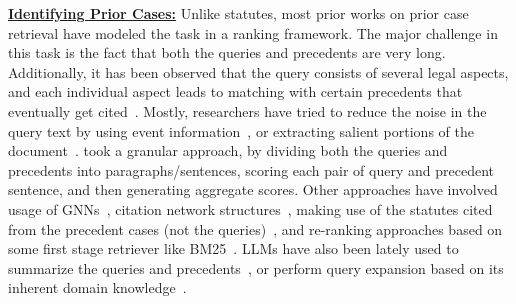 \vspace{1mm}
\noindent\underline{\bf Identifying Prior Cases:} \label{sec:relwork/precedents}
Unlike statutes, most prior works on prior case retrieval have modeled the task in a ranking framework. The major challenge in this task is the fact that both the queries and precedents are very long. 
Additionally, it has been observed that the query consists of several legal aspects, and each individual aspect leads to matching with certain precedents that eventually get cited~\citep{rabelo2022semantic}. 
Mostly, researchers have tried to reduce the noise in the query text by using event information~\citep{joshi2023ucreat,tang2024casegnn}, or extracting salient portions of the document~\citep{qin2024ljpretrieval}. 
\citet{rabelo2022semantic} took a granular approach, by dividing both the queries and precedents into paragraphs/sentences, scoring each pair of query and precedent sentence, and then generating aggregate scores.
Other approaches have involved usage of GNNs~\citep{tang2024casegnn,tang2024caselink}, citation network structures~\citep{bhattacharya2020hierspcnet}, making use of the statutes cited from the precedent cases (not the queries)~\citep{qin2024ljpretrieval}, and re-ranking approaches based on some first stage retriever like BM25~\citep{ma2021retrieving}.
LLMs have also been lately used to summarize the queries and precedents~\citep{qin2024ljpretrieval}, or perform query expansion based on its inherent domain knowledge~\citep{ma2024llmrelevance}.





